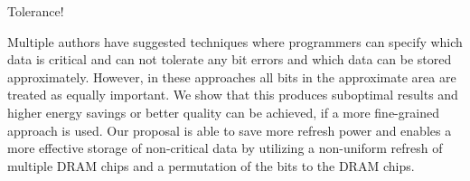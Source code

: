 Tolerance!\cite{sparkk}

Multiple authors have suggested techniques where programmers can specify which data is critical and can not tolerate any bit errors and which data can be stored approximately. However, in these approaches all bits in the approximate area are treated as equally important. We show that this produces suboptimal results and higher energy savings or better quality can be achieved, if a more fine-grained approach is used. Our proposal is able to save more refresh power and enables a more effective storage of non-critical data by utilizing a non-uniform refresh of multiple DRAM chips and a permutation of the bits to the DRAM chips. 